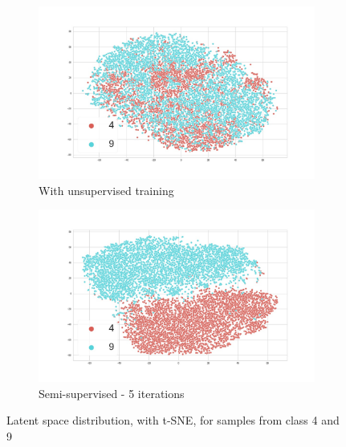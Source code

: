 \documentclass{bmvc2k}
\begin{document}
\begin{figure}[!t]
\centering
\begin{subfigure}[t]{.45\textwidth}
  \centering
  \includegraphics[width=0.9\linewidth]{images/tsne_4_9_unsup.jpg}
  \caption{With unsupervised training}
  \label{tsne_un_4_9}
\end{subfigure}\hfill
\begin{subfigure}[t]{.45\textwidth}
  \centering
  \includegraphics[width=0.9\linewidth]{images/tsne_4_9_semi.jpg}
  \caption{Semi-supervised - 5 iterations}
  \label{tsne_semi_4_9}
\end{subfigure}
\vspace{0.1in}

\caption{Latent space distribution, with t-SNE, for samples from class 4 and 9}
\label{tsne_4_9}
\end{figure}

\end{document}
